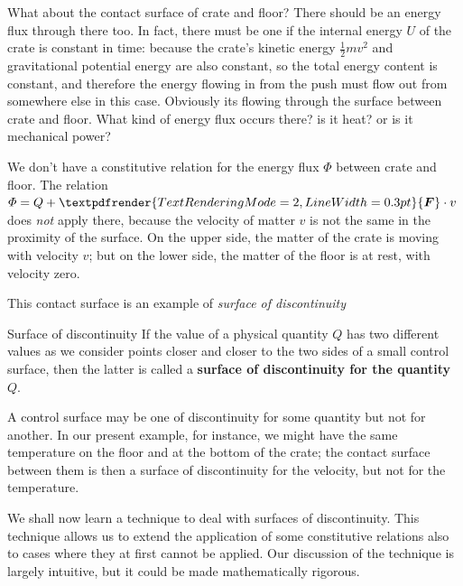 \documentclass[a4paper,12pt,%
onecolumn,oneside,titlepage,%
british%
]{memoir}
\renewcommand*{\bm}[1]{\textpdfrender{TextRenderingMode=2,LineWidth=0.3pt}{\boldsymbol{#1}}}
\renewcommand*{\|}[1][]{\nonscript\:#1\vert\nonscript\:\mathopen{}}
\newcommand*{\yM}{m}%
\newcommand*{\yU}{U}
\newcommand*{\yH}{\varPhi}%
\newcommand*{\yQ}{Q}%
\newcommand*{\yF}{\bm{F}}
\begin{document}
What about the contact surface of crate and floor? There should be an energy flux through there too. In fact, there must be one if the internal energy $\yU$ of the crate is constant in time: because the crate's kinetic energy $\tfrac12\yM v^{2}$ and gravitational potential energy are also constant, so the total energy content is constant, and therefore the energy flowing in from the push must flow out from somewhere else in this case. Obviously its flowing through the surface between crate and floor. What kind of energy flux occurs there? is it heat? or is it mechanical power?

We don't have a constitutive relation for the energy flux $\yH$ between crate and floor. The relation $\yH = \yQ + \yF\cdot v$ does \emph{not} apply there, because the velocity of matter $v$ is not the same in the proximity of the surface. On the upper side, the matter of the crate is moving with velocity $v$; but on the lower side, the matter of the floor is at rest, with velocity zero.

This contact surface is an example of \emph{surface of discontinuity}
\begin{definition}{Surface of discontinuity}
If the value of a physical quantity $Q$ has two different values as we consider points closer and closer to the two sides of a small control surface, then the latter is called a \textbf{surface of discontinuity for the quantity $Q$}.
\end{definition}
A control surface may be one of discontinuity for some quantity but not for another. In our present example, for instance, we might have the same temperature on the floor and at the bottom of the crate; the contact surface between them is then a surface of discontinuity for the velocity, but not for the temperature.

\smallskip

We shall now learn a technique to deal with surfaces of discontinuity. This technique allows us to extend the application of some constitutive relations also to cases where they at first cannot be applied. Our discussion of the technique is largely intuitive, but it could be made mathematically rigorous.
\end{document}
